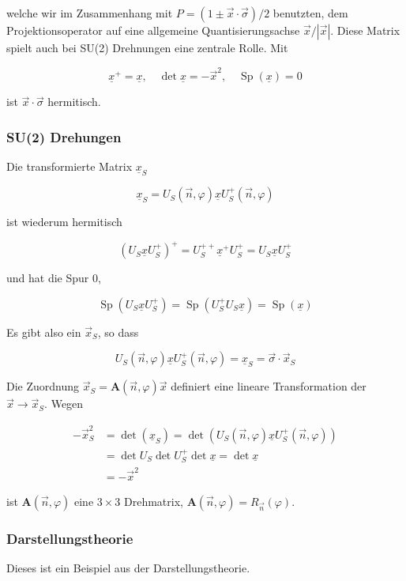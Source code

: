 \documentclass[10pt, letterpaper]{article}
\begin{document}
welche wir im Zusammenhang mit $P=(1 \pm \vec{x} \cdot \vec{\sigma}) / 2$ benutzten, dem Projektionsoperator auf eine allgemeine Quantisierungsachse $\vec{x} /|\vec{x}|$. Diese Matrix spielt auch bei SU(2) Drehnungen eine zentrale Rolle. Mit

$$
\underline{x}^{+}=\underline{x}, \quad \operatorname{det} \underline{x}=-\vec{x}^{2}, \quad \operatorname{Sp}(\underline{x})=0
$$

ist $\vec{x} \cdot \vec{\sigma}$ hermitisch.

\subsubsection*{SU(2) Drehungen}
Die transformierte Matrix $\underline{x}_{S}$

$$
\underline{x}_{S}=U_{S}(\vec{n}, \varphi) \underline{x} U_{S}^{+}(\vec{n}, \varphi)
$$

ist wiederum hermitisch

$$
\left(U_{S} \underline{x} U_{S}^{+}\right)^{+}=U_{S}^{++} \underline{x}^{+} U_{S}^{+}=U_{S} \underline{x} U_{S}^{+}
$$

und hat die Spur 0,

$$
\operatorname{Sp}\left(U_{S} \underline{x} U_{S}^{+}\right)=\operatorname{Sp}\left(U_{S}^{+} U_{S} \underline{x}\right)=\operatorname{Sp}(\underline{x})
$$

Es gibt also ein $\vec{x}_{S}$, so dass

$$
U_{S}(\vec{n}, \varphi) \underline{x} U_{S}^{+}(\vec{n}, \varphi)=\underline{x}_{S}=\vec{\sigma} \cdot \vec{x}_{S}
$$

Die Zuordnung $\vec{x}_{S}=\mathbf{A}(\vec{n}, \varphi) \vec{x}$ definiert eine lineare Transformation der $\vec{x} \rightarrow \vec{x}_{S}$. Wegen

$$
\begin{aligned}
-\vec{x}_{S}^{2} & =\operatorname{det}\left(\underline{x}_{S}\right)=\operatorname{det}\left(U_{S}(\vec{n}, \varphi) \underline{x} U_{S}^{+}(\vec{n}, \varphi)\right) \\
& =\operatorname{det} U_{S} \operatorname{det} U_{S}^{+} \operatorname{det} \underline{x}=\operatorname{det} \underline{x} \\
& =-\vec{x}^{2}
\end{aligned}
$$

ist $\mathbf{A}(\vec{n}, \varphi)$ eine $3 \times 3$ Drehmatrix, $\mathbf{A}(\vec{n}, \varphi)=R_{\vec{n}}(\varphi)$.

\subsubsection*{Darstellungstheorie}
Dieses ist ein Beispiel aus der Darstellungstheorie.
\end{document}
